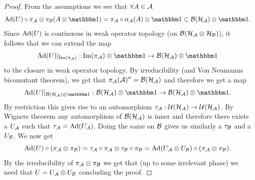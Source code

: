 \documentclass[12pt,a4paper,twoside]{article}
\numberwithin{equation}{section}
\begin{document}
\begin{proof}
From the assumptions we see that $\forall A\in\AA$
\begin{equation}
	\Ad{U}\circ\pi_\AA\otimes\pi_\BB(A\otimes\id)=\pi_\AA\circ\alpha_\AA(A)\otimes\id\subset \BB(\HH_\AA)\otimes\id.
\end{equation}
Since $\Ad{U}$ is continuous in weak operator topology (on $\BB(\HH_{\AA}\otimes\HH_{\BB})$), it follows that we can extend the map
\begin{equation}
	\Ad{U}|_{\textrm{Im}(\pi_\AA)}:\textrm{Im}(\pi_\AA)\otimes\id\rightarrow \BB(\HH_\AA)\otimes\id
\end{equation}
to the closure in weak operator topology. By irreducibility (and Von Neumanns bicomutant theorem), we get that $\pi_\AA(\AA)''=\BB(\HH_\AA)$ and therefore we get a map
\begin{equation}
	\Ad{U}|_{\BB(\HH_\AA)\otimes\id}:\BB(\HH_\AA)\otimes\id\rightarrow \BB(\HH_\AA)\otimes\id.
\end{equation}
By restriction this gives rise to an automorphism $\tau_\AA:\UU(\HH_\AA)\rightarrow\UU(\HH_\AA)$. By Wigners theorem any automorphism of $\BB(\HH_\AA)$ is inner and therefore there exists a $U_\AA$ such that $\tau_\AA=\Ad{U_\AA}$. Doing the same on $\BB$ gives us similarly a $\tau_\BB$ and a $U_\BB$. We now get
\begin{equation}
	\Ad{U}\circ(\pi_\AA\otimes\pi_\BB)=\tau_\AA\circ\pi_\AA\otimes\tau_\BB\circ\pi_\BB=\Ad{U_\AA\otimes U_\BB}\circ(\pi_\AA\otimes\pi_\BB).
\end{equation}
By the irreducibility of $\pi_\AA\otimes\pi_\BB$ we get that (up to some irrelevant phase) we need that $U=U_\AA\otimes U_\BB$ concluding the proof.
\end{proof}
\end{document}
